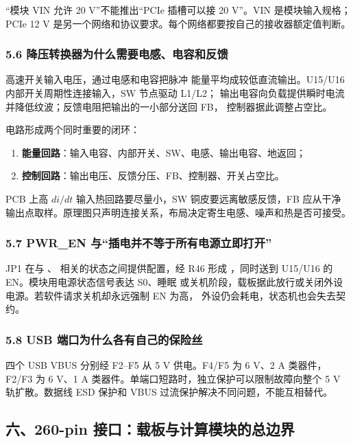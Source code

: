 “模块 VIN 允许 20 V”不能推出“PCIe 插槽可以接 20 V”。VIN 是模块输入规格；
PCIe 12 V 是另一个网络和协议要求。每个网络都要按自己的接收器额定值判断。

\subsubsection{5.6 降压转换器为什么需要电感、电容和反馈}

高速开关输入电压，通过电感和电容把脉冲
能量平均成较低直流输出。U15/U16 内部开关周期性连接输入，SW 节点驱动 L1/L2；
输出电容向负载提供瞬时电流并降低纹波；反馈电阻把输出的一小部分送回 FB，
控制器据此调整占空比。

电路形成两个同时重要的闭环：

\begin{enumerate}[leftmargin=2em]
  \item \textbf{能量回路}：输入电容、内部开关、SW、电感、输出电容、地返回；
  \item \textbf{控制回路}：输出电压、反馈分压、FB、控制器、开关占空比。
\end{enumerate}

PCB 上高 \(di/dt\) 输入热回路要尽量小，SW 铜皮要远离敏感反馈，FB 应从干净
输出点取样。原理图只声明连接关系，布局决定寄生电感、噪声和热是否可接受。

\subsubsection{5.7 PWR\_EN 与“插电并不等于所有电源立即打开”}

JP1 在与 、 相关的状态之间提供配置，经 R46 形成
，同时送到 U15/U16 的 EN。模块用电源状态信号表达 S0、睡眠
或关机阶段，载板据此放行或关闭外设电源。若软件请求关机却永远强制 EN 为高，
外设仍会耗电，状态机也会失去契约。

\subsubsection{5.8 USB 端口为什么各有自己的保险丝}

四个 USB VBUS 分别经 F2--F5 从 5 V 供电。F4/F5 为 6 V、2 A 类器件，
F2/F3 为 6 V、1 A 类器件。单端口短路时，独立保护可以限制故障向整个 5 V
轨扩散。数据线 ESD 保护和 VBUS 过流保护解决不同问题，不能互相替代。

\subsection{六、260-pin 接口：载板与计算模块的总边界}

